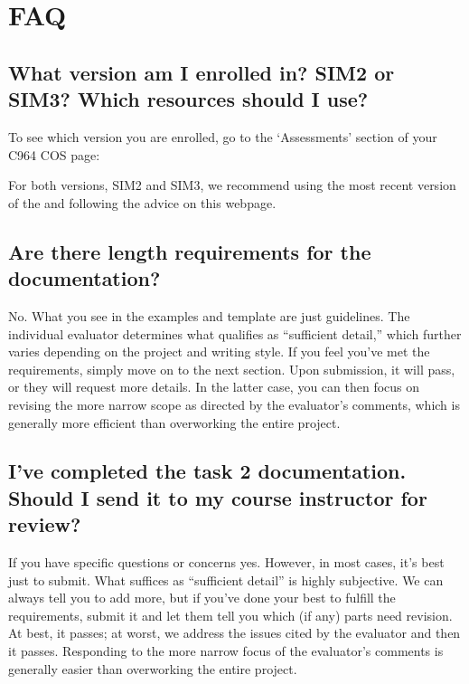 \documentclass[letterpaper,10pt,english]{jupyterBook}
\begin{document}
\section{FAQ}
\label{\detokenize{task2_doc/task2_doc:faq}}\label{\detokenize{task2_doc/task2_doc:task2doc-faq}}

\subsection{What version am I enrolled in? SIM2 or SIM3? Which resources should I use?}
\label{\detokenize{task2_doc/task2_doc:what-version-am-i-enrolled-in-sim2-or-sim3-which-resources-should-i-use}}
\sphinxAtStartPar
To see which version you are enrolled, go to the ‘Assessments’ section of your C964 COS page:

\sphinxAtStartPar
For both versions, SIM2 and SIM3, we recommend using the most recent version of the  and following the advice on this webpage.


\subsection{Are there length requirements for the documentation?}
\label{\detokenize{task2_doc/task2_doc:are-there-length-requirements-for-the-documentation}}
\sphinxAtStartPar
No. What you see in the examples and template are just guidelines. The individual evaluator determines what qualifies as “sufficient detail,” which further varies depending on the project and writing style. If you feel you’ve met the requirements, simply move on to the next section. Upon submission, it will pass, or they will request more details. In the latter case, you can then focus on revising the more narrow scope as directed by the evaluator’s comments, which is generally more efficient than overworking the entire project.


\subsection{I’ve completed the task 2 documentation. Should I send it to my course instructor for review?}
\label{\detokenize{task2_doc/task2_doc:i-ve-completed-the-task-2-documentation-should-i-send-it-to-my-course-instructor-for-review}}
\sphinxAtStartPar
If you have specific questions or concerns \sphinxhyphen{}yes. However, in most cases, it’s best just to submit. What suffices as “sufficient detail” is highly subjective. We can always tell you to add more, but if you’ve done your best to fulfill the requirements, submit it and let them tell you which (if any) parts need revision. At best, it passes; at worst, we address the issues cited by the evaluator \sphinxhyphen{}and then it passes. Responding to the more narrow focus of the evaluator’s comments is generally easier than overworking the entire project.
\end{document}
